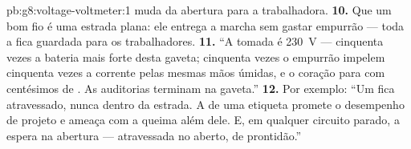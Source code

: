 \begin{solution}{pb:g8:voltage-voltmeter:1}
muda da abertura para a trabalhadora.
\textbf{10.} Que um bom fio é uma estrada plana: ele entrega a marcha
sem gastar empurrão --- toda a  fica guardada para os
trabalhadores.
\textbf{11.} ``A tomada é \qty{230}{V} --- cinquenta vezes a bateria
mais forte desta gaveta; cinquenta vezes o empurrão impelem cinquenta
vezes a corrente pelas mesmas mãos úmidas, e o coração para com
centésimos de . As auditorias terminam na gaveta.''
\textbf{12.} Por exemplo: ``Um  fica atravessado, nunca
dentro da estrada. A  de uma etiqueta promete o
desempenho de projeto e ameaça com a queima além dele. E, em qualquer
circuito parado, a  espera na abertura --- atravessada no
 aberto, de prontidão.''
\end{solution}
